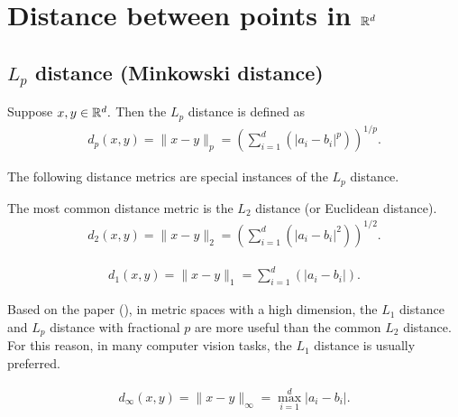 \section{Distance between points in $\mathbb R^d$}

\subsection{$L_p$ distance (Minkowski distance)}
\begin{defn}[$L_p$ distance]
Suppose $x, y \in \mathbb R^d.$ Then the $L_p$ distance is defined as 
\begin{align}
    d_p(x,y) = \|x - y\|_p = \left(\sum_{i=1}^d(|a_i - b_i|^p)\right)^{1/p}.
\end{align}
\end{defn}

The following distance metrics are special instances of the $L_p$ distance. 

\begin{defn}
The most common distance metric is the $L_2$ distance (or Euclidean distance). 
\begin{align}
      d_2(x,y) = \|x - y\|_2 = \left(\sum_{i=1}^d(|a_i - b_i|^2)\right)^{1/2}.
\end{align}
\end{defn}

\begin{defn}
\begin{align}
      d_1(x,y) = \|x - y\|_1 = \sum_{i=1}^d(|a_i - b_i|).  
\end{align}
\end{defn}

Based on the paper (\cite{goos_surprising_2001}), in metric spaces with a high dimension, the $L_1$ distance and $L_p$ distance with fractional $p$ are more useful than the common $L_2$ distance. For this reason, in many computer vision tasks, the  $L_1$ distance is usually preferred. 

\begin{defn}
\begin{align}
      d_\infty(x,y) = \|x - y\|_\infty = \max_{i=1}^d |a_i - b_i|.
\end{align}
\end{defn}

